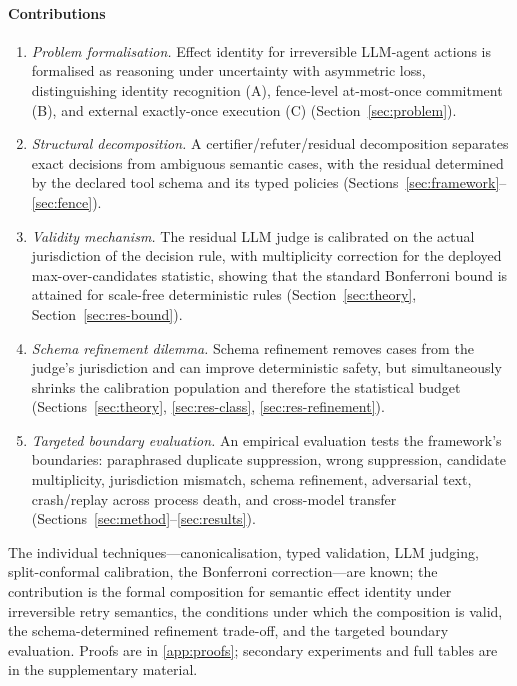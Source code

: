 \paragraph{Contributions}
\begin{enumerate}[(C1),leftmargin=*,itemsep=1pt]
\item \emph{Problem formalisation.} Effect identity for irreversible LLM-agent actions is formalised as reasoning under uncertainty with asymmetric loss, distinguishing identity recognition (A), fence-level at-most-once commitment (B), and external exactly-once execution (C) (Section~\ref{sec:problem}).
\item \emph{Structural decomposition.} A certifier/refuter/residual decomposition separates exact decisions from ambiguous semantic cases, with the residual determined by the declared tool schema and its typed policies (Sections~\ref{sec:framework}--\ref{sec:fence}).
\item \emph{Validity mechanism.} The residual LLM judge is calibrated on the actual jurisdiction of the decision rule, with multiplicity correction for the deployed max-over-candidates statistic, showing that the standard Bonferroni bound is attained for scale-free deterministic rules (Section~\ref{sec:theory}, Section~\ref{sec:res-bound}).
\item \emph{Schema refinement dilemma.} Schema refinement removes cases from the judge's jurisdiction and can improve deterministic safety, but simultaneously shrinks the calibration population and therefore the statistical budget (Sections~\ref{sec:theory}, \ref{sec:res-class}, \ref{sec:res-refinement}).
\item \emph{Targeted boundary evaluation.} An empirical evaluation tests the framework's boundaries: paraphrased duplicate suppression, wrong suppression, candidate multiplicity, jurisdiction mismatch, schema refinement, adversarial text, crash/replay across process death, and cross-model transfer (Sections~\ref{sec:method}--\ref{sec:results}).
\end{enumerate}
The individual techniques---canonicalisation, typed validation, LLM judging, split-conformal calibration, the Bonferroni correction---are known; the contribution is the formal composition for semantic effect identity under irreversible retry semantics, the conditions under which the composition is valid, the schema-determined refinement trade-off, and the targeted boundary evaluation. Proofs are in \ref{app:proofs}; secondary experiments and full tables are in the supplementary material.
